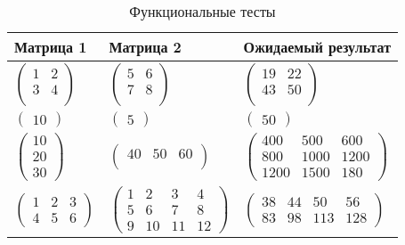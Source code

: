 \begin{table}[h]
	\caption{\label{tabular:functional_test} Функциональные тесты}
	\begin{tabularx}{\textwidth}{|X|X|X|}
		\hline   
		\centering \textbf{Матрица 1} & \centering \textbf{Матрица 2} & \centering \textbf{Ожидаемый результат} \tabularnewline
		\hline
		\centering
		$\begin{pmatrix}
			1 & 2\\
			3 & 4\\
		\end{pmatrix}$ &
		\centering
		$\begin{pmatrix}
			5 & 6\\
			7 & 8\\
		\end{pmatrix}$ &
		\centering
		$\begin{pmatrix}
			19 & 22\\
			43 & 50\\
		\end{pmatrix}$\tabularnewline
		\hline
		\centering
		$\begin{pmatrix}
			10
		\end{pmatrix}$ &
		\centering
		$\begin{pmatrix}
			5
		\end{pmatrix}$ &
		\centering
		$\begin{pmatrix}
			50
		\end{pmatrix}$ \tabularnewline
		\hline
		\centering
		$\begin{pmatrix}
			10\\
			20\\
			30
		\end{pmatrix}$ &
		\centering
		$\begin{pmatrix}
			40 & 50 & 60\\
		\end{pmatrix}$ &
		\centering
		$\begin{pmatrix}
			400 &  500  & 600\\ 
			800 & 1000 & 1200\\ 
			1200 & 1500 & 180
		\end{pmatrix}$ \tabularnewline
		\hline
		\centering
		$\begin{pmatrix}
			1   &  2  &   3\\ 
			4   &  5  &   6
		\end{pmatrix}$ &
		\centering
		$\begin{pmatrix}
			1  &   2  &   3   &  4\\ 
			5  &   6  &   7   &  8\\ 
			9  &  10  &  11   & 12
		\end{pmatrix}$ &
		\centering
		$\begin{pmatrix}
			38 &   44  &  50  &  56\\ 
			83  &  98  & 113 &  128
		\end{pmatrix}$ \tabularnewline
		\hline
	\end{tabularx}
\end{table}



